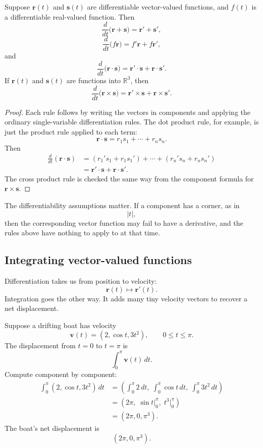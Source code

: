 \begin{theorem}
Suppose \(\mathbf r(t)\) and \(\mathbf s(t)\) are differentiable vector-valued functions,
and \(f(t)\) is a differentiable real-valued function.  Then
\[
    \frac{d}{dt}\bigl(\mathbf r+\mathbf s\bigr)
    =
    \mathbf r'+\mathbf s',
\]
\[
    \frac{d}{dt}\bigl(f\mathbf r\bigr)
    =
    f'\mathbf r+f\mathbf r',
\]
and
\[
    \frac{d}{dt}\bigl(\mathbf r\cdot\mathbf s\bigr)
    =
    \mathbf r'\cdot\mathbf s+\mathbf r\cdot\mathbf s'.
\]
If \(\mathbf r(t)\) and \(\mathbf s(t)\) are functions into \(\mathbb R^3\), then
\[
    \frac{d}{dt}\bigl(\mathbf r\times\mathbf s\bigr)
    =
    \mathbf r'\times\mathbf s+\mathbf r\times\mathbf s'.
\]
\end{theorem}

\begin{proof}
Each rule follows by writing the vectors in components and applying the ordinary
single-variable differentiation rules.  The dot product rule, for example, is just the
product rule applied to each term:
\[
    \mathbf r\cdot\mathbf s
    =
    r_1s_1+\cdots+r_ns_n.
\]
Then
\[
\begin{aligned}
\frac{d}{dt}(\mathbf r\cdot\mathbf s)
&=
(r_1's_1+r_1s_1')+\cdots+(r_n's_n+r_ns_n')\\
&=
\mathbf r'\cdot\mathbf s+\mathbf r\cdot\mathbf s'.
\end{aligned}
\]
The cross product rule is checked the same way from the component formula for
\(\mathbf r\times\mathbf s\).
\end{proof}

The differentiability assumptions matter.  If a component has a corner, as in
\[
    |t|,
\]
then the corresponding vector function may fail to have a derivative, and the rules
above have nothing to apply to at that time.

\subsection{Integrating vector-valued functions}

Differentiation takes us from position to velocity:
\[
    \mathbf r(t)\longmapsto \mathbf r'(t).
\]
Integration goes the other way.  It adds many tiny velocity vectors to recover a net
displacement.

Suppose a drifting boat has velocity
\[
    \mathbf v(t)=(2,\cos t,3t^2),
    \qquad 0\le t\le\pi.
\]
The displacement from \(t=0\) to \(t=\pi\) is
\[
    \int_0^\pi \mathbf v(t)\,dt.
\]
Compute component by component:
\[
\begin{aligned}
\int_0^\pi (2,\cos t,3t^2)\,dt
&=
\left(
    \int_0^\pi 2\,dt,\;
    \int_0^\pi \cos t\,dt,\;
    \int_0^\pi 3t^2\,dt
\right)\\
&=
\left(
    2\pi,\;
    \sin t\bigg|_0^\pi,\;
    t^3\bigg|_0^\pi
\right)\\
&=
(2\pi,0,\pi^3).
\end{aligned}
\]
The boat's net displacement is
\[
    (2\pi,0,\pi^3).
\]

